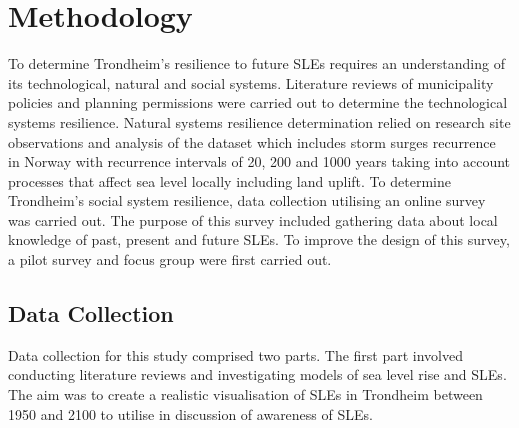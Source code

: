 
\chapter{Methodology}
To determine Trondheim's resilience to future SLEs requires an understanding of its technological, natural and social systems. Literature reviews of  municipality policies and planning permissions were carried out to determine the technological systems resilience. Natural systems resilience determination relied on research site observations and analysis of the dataset \cite{kartverket_se_2021} which includes storm surges recurrence in Norway with recurrence intervals of 20, 200 and 1000 years taking into account processes that affect sea level locally including land uplift. To determine Trondheim's social system resilience, data collection utilising an online survey was carried out. The purpose of this survey included gathering data about local knowledge of past, present and future SLEs. To improve the design of this survey, a pilot survey and focus group were first carried out.  


\section{Data Collection} \label{data-collection}

Data collection for this study comprised two parts.  The first part involved conducting literature reviews and investigating models of sea level rise and SLEs. The aim was to create a realistic visualisation of SLEs in Trondheim between 1950 and 2100 to utilise in discussion of awareness of SLEs. 
\paragraph{}


